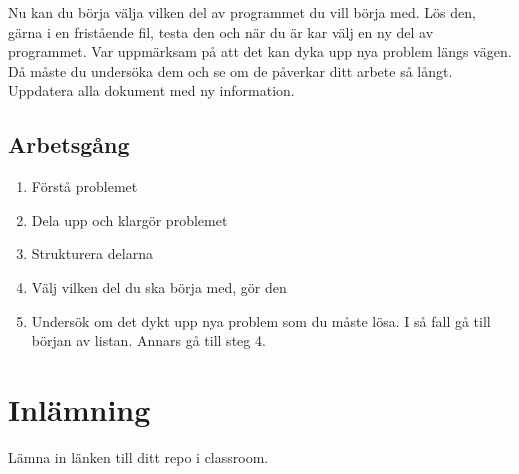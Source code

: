 \documentclass[11pt]{article}
\begin{document}
    Nu kan du börja välja vilken del av programmet du vill börja med. Lös den, gärna i en fristående fil, testa den och när du är kar
    välj en ny del av programmet. Var uppmärksam på att det kan dyka upp nya problem längs vägen. Då måste du undersöka dem och se om de
    påverkar ditt arbete så långt. Uppdatera alla dokument med ny information.

    \subsection{Arbetsgång}
    \begin{enumerate}
        \item Förstå problemet
        \item Dela upp och klargör problemet
        \item Strukturera delarna
        \item Välj vilken del du ska börja med, gör den
        \item Undersök om det dykt upp nya problem som du måste lösa. I så fall gå till början av listan. Annars gå till steg 4.
    \end{enumerate}

    \section{Inlämning}
    Lämna in länken till ditt repo i classroom.
\end{document}
